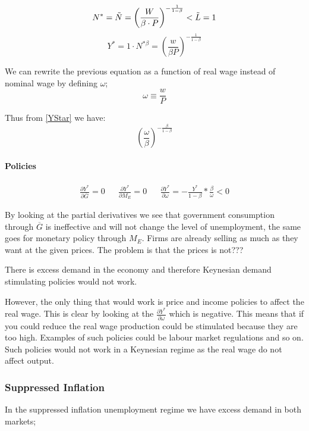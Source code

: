 $$
N^* = \Tilde{N} = \left( \frac { W } { \beta \cdot P } \right) ^  { - \frac { 1 } { 1 - \beta }} < \Tilde{L} = 1
$$
\begin{equation}\label{YStar}
    Y^* = 1 \cdot N^{*\beta} = \left(  \frac{w}{\beta P} \right)^{ - \frac{1}{1 - \beta}} 
\end{equation}

We can rewrite the previous equation as a function of real wage instead of nominal wage by defining $\omega$;
$$
\omega \equiv \frac{w}{P}
$$

Thus from \ref{YStar} we have: 
$$
\left( \frac{\omega}{\beta} \right) ^{ - \frac{\beta}{1 - \beta}}
$$




\paragraph{Policies}

\begin{align*}
    \frac { \partial Y ^ { * } } { \partial \overline { G } } = 0 && \frac { \partial Y ^ { * } } { \partial M_E } = 0 
    &  & \frac{\partial Y^*}{\partial \omega} = - \frac{Y^*}{1 - \beta} * \frac{\beta}{\omega} < 0
\end{align*}

By looking at the partial derivatives we see that government consumption through $\overline{G}$ is ineffective and will not change the level of unemployment, the same goes for monetary policy through $M_E$. Firms are already selling as much as they want at the given prices. The problem is that the prices is not???

There is excess demand in the economy and therefore Keynesian demand stimulating policies would not work. 

However, the only thing that would work is price and income policies to affect the real wage. This is clear by looking at the $\tfrac{\partial Y^*}{\partial \omega}$ which is negative. This means that if you could reduce the real wage production could be stimulated because they are too high. Examples of such policies could be labour market regulations and so on.  Such policies would not work in a Keynesian regime as the real wage do not affect output. 



\subsubsection*{Suppressed Inflation}
In the suppressed inflation unemployment regime we have excess demand in both markets; 

